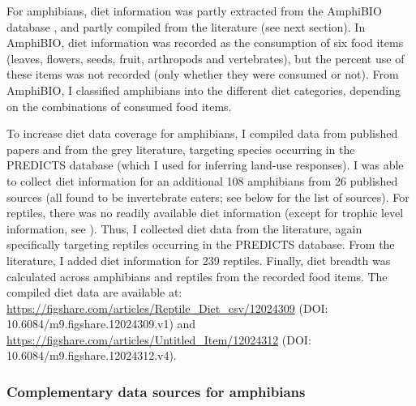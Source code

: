 For amphibians, diet information was partly extracted from the AmphiBIO database \citep{Oliveira2017}, and partly compiled from the literature (see next section). In AmphiBIO, diet information was recorded as the consumption of six food items (leaves, flowers, seeds, fruit, arthropods and vertebrates), but the percent use of these items was not recorded (only whether they were consumed or not). From AmphiBIO, I classified amphibians into the different diet categories, depending on the combinations of consumed food items. 

To increase diet data coverage for amphibians, I compiled data from published papers and from the grey literature, targeting species occurring in the PREDICTS database (which I used for inferring land-use responses). I was able to collect diet information for an additional 108 amphibians from 26 published sources (all found to be invertebrate eaters; see below for the list of sources). For reptiles, there was no readily available diet information (except for trophic level information, see \citet{Etard2020}). Thus, I collected diet data from the literature, again specifically targeting reptiles occurring in the PREDICTS database. From the literature, I added diet information for 239 reptiles. Finally, diet breadth was calculated across amphibians and reptiles from the recorded food items. The compiled diet data are available at:
\url{https://figshare.com/articles/Reptile_Diet_csv/12024309} (DOI: 10.6084/m9.figshare.12024309.v1) and
\url{https://figshare.com/articles/Untitled_Item/12024312} (DOI: 10.6084/m9.figshare.12024312.v4).

\subsubsection*{Complementary data sources for amphibians}

